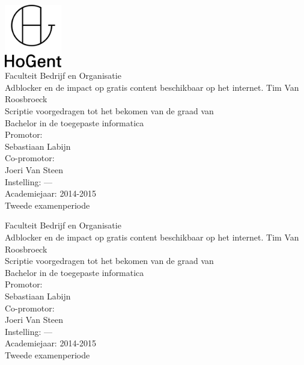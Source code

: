 \documentclass[pdftex,a4paper,12pt,twoside]{report}
\newcommand{\emptypage}{
\newpage
\thispagestyle{empty}
\mbox{}
\newpage
}
\newcommand{\student}{Tim Van Roosbroeck}
\newcommand{\promotor}{Sebastiaan Labijn}
\newcommand{\copromotor}{Joeri Van Steen}
\newcommand{\instelling}{---}
\newcommand{\titel}{Adblocker en de impact op gratis content beschikbaar op het internet.}
\newcommand{\faculteit}{Faculteit Bedrijf en Organisatie}
\newcommand{\rapporttype}{Scriptie voorgedragen tot het bekomen van de graad van\\Bachelor in de toegepaste informatica}
\newcommand{\academiejaar}{2014-2015}
\newcommand{\examenperiode}{Tweede examenperiode}
\begin{document}

\begin{titlepage}
  \begin{center}

    \begingroup
    \rmfamily
    \includegraphics[width=2.5cm]{img/HG-beeldmerk-woordmerk}\\[.5cm]
    \faculteit\\[3cm]
    \titel
    \vfill
    \student\\[3.5cm]
    \rapporttype\\[2cm]
    Promotor:\\
    \promotor\\
    Co-promotor:\\
    \copromotor\\[2.5cm]
    Instelling: \instelling\\[.5cm]
    Academiejaar: \academiejaar\\[.5cm]
    \examenperiode
    \endgroup

  \end{center}
  \restoregeometry
\end{titlepage}



\emptypage


\begin{titlepage}
  \begin{center}

    \begingroup
    \rmfamily
    \faculteit\\[3cm]
    \titel
    \vfill
    \student\\[3.5cm]
    \rapporttype\\[2cm]
    Promotor:\\
    \promotor\\
    Co-promotor:\\
    \copromotor\\[2.5cm]
    Instelling: \instelling\\[.5cm]
    Academiejaar: \academiejaar\\[.5cm]
    \examenperiode
    \endgroup

  \end{center}
  \restoregeometry
\end{titlepage}
\end{document}
